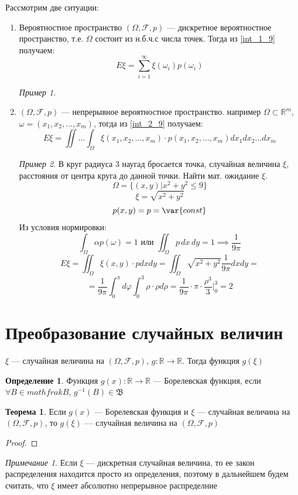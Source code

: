 \documentclass[oneside]{book}
\newcommand{\R}{\mathbb{R}}
\newcommand{\const}{\var{const}}
\newcommand{\todo}{{\color{red}\fbox{\text{Доделать}}}}
\newcommand{\fixme}{{\color{red}\fbox{\text{Исправить}}}}
\theoremstyle{plain}
\theoremstyle{remark}
\newtheorem*{remark}{Примечание}
\newtheorem*{examp}{Пример}
\theoremstyle{definition}
\newtheorem{theorem}{Теорема}[section]
\newtheorem*{definition}{Определение}
\begin{document}
Рассмотрим две ситуации:
\begin{enumerate}
\item Вероятностное пространство \((\Omega, \mathcal{F}, p)\) --- дискретное вероятностное пространство, т.е. \(\Omega\) состоит из н.б.ч.с числа точек. Тогда из \ref{int_1_9} получаем:
\[ E\xi = \sum_{i = 1}^\infty \xi(\omega_i) p(\omega_i) \]
\begin{examp}
\todo
\end{examp}
\item \((\Omega, \mathcal{F}, p)\) --- непрерывное вероятностное пространство. например \(\Omega \subset \R^m\), \(\omega = (x_1, x_2, \dots, x_m)\), тогда из \ref{int_2_9} получаем:
\[ E\xi = \iint\dots\int_\Omega \xi(x_1, x_2, \dots, x_m)\cdot p(x_1, x_2, \dots, x_m) dx_1 dx_2\dots dx_m \]
\begin{examp}
В круг радиуса 3 наугад бросается точка, случайная величина \(\xi\), расстояния от центра круга до данной точки. Найти мат. ожидание \(\xi\).
\[ \Omega = \{(x, y) \Big| x^2 + y^2 \le 9\} \]
\[ \xi = \sqrt{x^2 + y^2} \]
\[ p(x, y) = p = \const \]
Из условия нормировки:
\[ \int_\Omega \alpha p(\omega) = 1 \text{ или } \iint_\Omega p\,dx\,dy = 1 \implies \frac{1}{9 \pi} \]
\[ E\xi = \iint_\Omega \xi(x, y)\cdot p dx dy = \iint_\Omega \sqrt{x^2 + y^2} \frac{1}{9 \pi} dx dy = \]
\[ = \frac{1}{9\pi} \int_0^\pi d\varphi \int_0^3 \rho \cdot \rho d\rho = \frac{1}{9\pi}\cdot\pi\cdot\frac{\rho^3}{3} \bigg|_0^3 = 2 \]
\fixme
\end{examp}
\end{enumerate}
\section{Преобразование случайных величин}
\label{sec:orgd625fc5}
\(\xi\) --- случайная величина на \((\Omega, \mathcal{F}, p)\), \(g: \R \to \R\). Тогда функция \(g(\xi)\)
\begin{definition}
Функция \(g(x): \R \to \R\) --- Борелевская функция, если \(\forall B \in mathfrak{B}\), \(g^{-1}(B) \in \mathfrak{B}\)
\end{definition}
\begin{theorem}
Если \(g(x)\) --- Борелевская функция и \(\xi\) --- случайная величина на \((\Omega, \mathcal{F}, p)\), то \(g(\xi)\) --- случайная величина на \((\Omega, \mathcal{F}, p)\)
\end{theorem}
\begin{proof}
\todo
\end{proof}
\begin{remark}
Если \(\xi\) --- дискретная случайная величина, то ее закон распределения находится просто из определения, поэтому в дальнейшем будем считать, что \(\xi\) имеет абсолютно непрерывное распределние
\end{remark}
\end{document}
